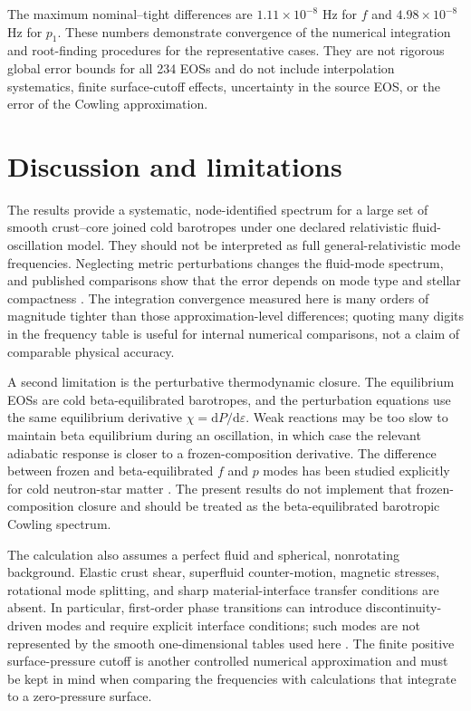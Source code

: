 \documentclass[aps,prd,twocolumn,superscriptaddress,nofootinbib]{revtex4-2}
\newcommand{\eps}{\varepsilon}
\newcommand{\dd}{\mathrm{d}}
\begin{document}
The maximum nominal--tight differences are $1.11\times10^{-8}$ Hz for $f$ and $4.98\times10^{-8}$ Hz for $p_1$. These numbers demonstrate convergence of the numerical integration and root-finding procedures for the representative cases. They are not rigorous global error bounds for all 234 EOSs and do not include interpolation systematics, finite surface-cutoff effects, uncertainty in the source EOS, or the error of the Cowling approximation.

\section{Discussion and limitations}

The results provide a systematic, node-identified spectrum for a large set of smooth crust--core joined cold barotropes under one declared relativistic fluid-oscillation model. They should not be interpreted as full general-relativistic mode frequencies. Neglecting metric perturbations changes the fluid-mode spectrum, and published comparisons show that the error depends on mode type and stellar compactness \cite{YoshidaKojima1997,Kokkotas1996}. The integration convergence measured here is many orders of magnitude tighter than those approximation-level differences; quoting many digits in the frequency table is useful for internal numerical comparisons, not a claim of comparable physical accuracy.

A second limitation is the perturbative thermodynamic closure. The equilibrium EOSs are cold beta-equilibrated barotropes, and the perturbation equations use the same equilibrium derivative $\chi=\dd P/\dd\eps$. Weak reactions may be too slow to maintain beta equilibrium during an oscillation, in which case the relevant adiabatic response is closer to a frozen-composition derivative. The difference between frozen and beta-equilibrated $f$ and $p$ modes has been studied explicitly for cold neutron-star matter \cite{Montefusco2025}. The present results do not implement that frozen-composition closure and should be treated as the beta-equilibrated barotropic Cowling spectrum.

The calculation also assumes a perfect fluid and spherical, nonrotating background. Elastic crust shear, superfluid counter-motion, magnetic stresses, rotational mode splitting, and sharp material-interface transfer conditions are absent. In particular, first-order phase transitions can introduce discontinuity-driven modes and require explicit interface conditions; such modes are not represented by the smooth one-dimensional tables used here \cite{RaneaSandoval2018}. The finite positive surface-pressure cutoff is another controlled numerical approximation and must be kept in mind when comparing the frequencies with calculations that integrate to a zero-pressure surface.
\end{document}
